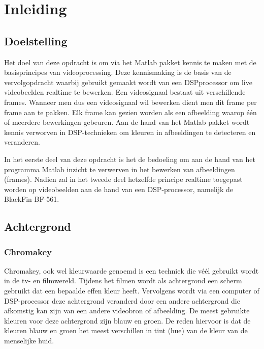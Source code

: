 \chapter{Inleiding}

\section{Doelstelling}
\par Het doel van deze opdracht is om via het Matlab pakket kennis te maken met de basisprincipes van videoprocessing.
Deze kennismaking is de basis van de vervolgopdracht waarbij gebruikt gemaakt wordt van een DSPprocessor om live
videobeelden realtime te bewerken. Een videosignaal bestaat uit verschillende frames. Wanneer men dus een videosignaal
wil bewerken dient men dit frame per frame aan te pakken. Elk frame kan gezien worden als een afbeelding waarop \'e\'en of 
meerdere bewerkingen gebeuren. Aan de hand van het Matlab pakket wordt kennis verworven in DSP-technieken om kleuren in
afbeeldingen te detecteren en veranderen. \bigskip

\par In het eerste deel van deze opdracht is het de bedoeling om aan de hand van het programma Matlab inzicht te verwerven
in het bewerken van afbeeldingen (frames). Nadien zal in het tweede deel hetzelfde principe realtime toegepast worden op 
videobeelden aan de hand van een DSP-processor, namelijk de BlackFin BF-561.

\section {Achtergrond}

\subsection{Chromakey}

\par Chromakey, ook wel kleurwaarde genoemd is een techniek die v\'e\'el gebruikt wordt in de tv- en filmwereld. Tijdens het 
filmen wordt als achtergrond een scherm gebruikt dat een bepaalde effen kleur heeft. Vervolgens wordt via een computer of DSP-processor
deze achtergrond veranderd door een andere achtergrond die afkomstig kan zijn van een andere videobron of afbeelding. De meest gebruikte
kleuren voor deze achtergrond zijn blauw en groen. De reden hiervoor is dat de kleuren blauw en groen het meest verschillen in tint (hue) van
de kleur van de menselijke huid. \bigskip

